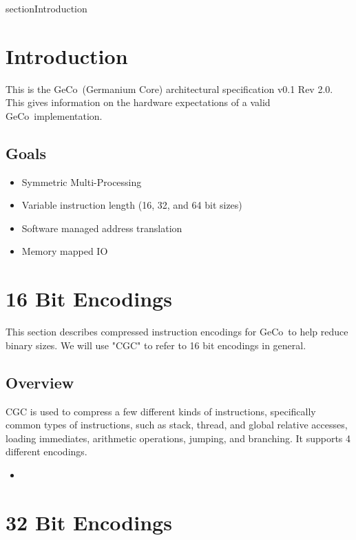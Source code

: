 \documentclass{article}
\title{\name}
\author{Lilly Anderson}
\def\version{0.1 Rev 2.0}
\def\name{Germanium Core}
\def\sname{GeCo}
\begin{document}
\maketitle

\pagebreak
\tableofcontents

\pagebreak
{}
{section}{Introduction}
\section*{Introduction}
This is the \sname\ (\name) architectural specification v\version. This gives information on the hardware expectations of a valid \sname\ implementation.

\subsection{Goals}
\begin{itemize}
    \item Symmetric Multi-Processing
    \item Variable instruction length (16, 32, and 64 bit sizes)
    \item Software managed address translation
    \item Memory mapped IO
\end{itemize}

\section{16 Bit Encodings}
This section describes compressed instruction encodings for \sname\ to help reduce binary sizes. We will use "CGC" to refer to 16 bit encodings in general.

\subsection{Overview}
CGC is used to compress a few different kinds of instructions, specifically common types of instructions, such as stack, thread, and global relative accesses, loading immediates, arithmetic operations, jumping, and branching. It supports 4 different encodings.
\begin{itemize}
    \item 
\end{itemize}

\section{32 Bit Encodings}
\end{document}
